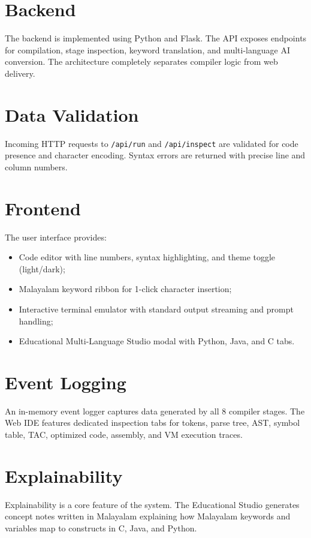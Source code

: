 \documentclass[12pt,a4paper]{report}
\begin{document}
\section{Backend}
The backend is implemented using Python and Flask. The API exposes endpoints for compilation, stage inspection, keyword translation, and multi-language AI conversion. The architecture completely separates compiler logic from web delivery.

\section{Data Validation}
Incoming HTTP requests to \texttt{/api/run} and \texttt{/api/inspect} are validated for code presence and character encoding. Syntax errors are returned with precise line and column numbers.

\section{Frontend}
The user interface provides:
\begin{itemize}
    \item Code editor with line numbers, syntax highlighting, and theme toggle (light/dark);
    \item Malayalam keyword ribbon for 1-click character insertion;
    \item Interactive terminal emulator with standard output streaming and prompt handling;
    \item Educational Multi-Language Studio modal with Python, Java, and C tabs.
\end{itemize}

\section{Event Logging}
An in-memory event logger captures data generated by all 8 compiler stages. The Web IDE features dedicated inspection tabs for tokens, parse tree, AST, symbol table, TAC, optimized code, assembly, and VM execution traces.

\section{Explainability}
Explainability is a core feature of the system. The Educational Studio generates concept notes written in Malayalam explaining how Malayalam keywords and variables map to constructs in C, Java, and Python.
\end{document}
